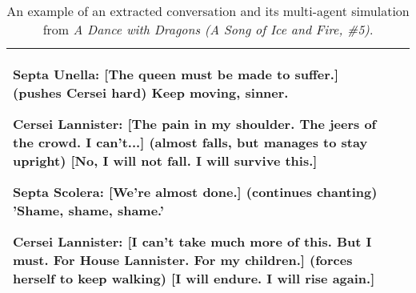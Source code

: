 \begin{table*}[h]
{\begin{tabular}{p{1in}|p{5.4in}}
\quad 

Septa Unella: [The queen must be made to suffer.] (pushes Cersei hard) Keep moving, sinner.

\quad 

Cersei Lannister: [The pain in my shoulder. The jeers of the crowd. I can't...] (almost falls, but manages to stay upright) [No, I will not fall. I will survive this.]

\quad 

Septa Scolera: [We're almost done.] (continues chanting) 'Shame, shame, shame.'

\quad 

Cersei Lannister: [I can't take much more of this. But I must. For House Lannister. For my children.] (forces herself to keep walking) [I will endure. I will rise again.]

\\ 
    
\bottomrule

\end{tabular}}

\caption{An example of an extracted conversation and its multi-agent simulation from \textit{A Dance with Dragons (A Song of Ice and Fire, \#5)}. }
\label{tab:case_cerci2}
\end{table*}

